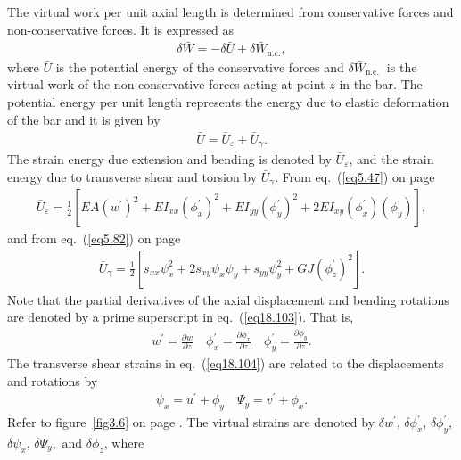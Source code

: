 \documentclass{AeroStructure-ERJohnson}
\begin{document}
The virtual work per unit axial length is determined from conservative forces and non-conservative forces. It is expressed as
\begin{align}\label{eq18.101}
\delta \bar{W}=-\delta \bar{U}+\delta \bar{W}_{\text {n.c.}},
\end{align}
where $\bar{U}$ is the potential energy of the conservative forces and $\delta \bar{W}_{\text {n.c. }}$ is the virtual work of the non-conservative forces acting at point $z$ in the bar. The potential energy per unit length represents the energy due to elastic deformation of the bar and it is given by
\begin{align}\label{eq18.102}
\bar{U}=\bar{U}_{\varepsilon}+\bar{U}_{\gamma}.
\end{align}
The strain energy due extension and bending is denoted by $\bar{U}_{\varepsilon}$, and the strain energy due to transverse shear and torsion by $\bar{U}_{\gamma}$. From eq.~(\ref{eq5.47}) on page \pageref{eq5.47}
\begin{align}\label{eq18.103}
\bar{U}_{\varepsilon}=\frac{1}{2}\left[E A\left(w^{\prime}\right)^{2}+E I_{x x}\left(\phi_{x}^{\prime}\right)^{2}+E I_{y y}\left(\phi_{y}^{\prime}\right)^{2}+2 E I_{x y}\left(\phi_{x}^{\prime}\right)\left(\phi_{y}^{\prime}\right)\right],
\end{align}
and from eq.~(\ref{eq5.82}) on page \pageref{eq5.82}
\begin{align}\label{eq18.104}
\bar{U}_{\gamma}=\frac{1}{2}\left[s_{x x} \psi_{x}^{2}+2 s_{x y} \psi_{x} \psi_{y}+s_{y y} \psi_{y}^{2}+G J\left(\phi_{z}^{\prime}\right)^{2}\right].
\end{align}
Note that the partial derivatives of the axial displacement and bending rotations are denoted by a prime superscript in eq.~(\ref{eq18.103}). That is,
\begin{align}\label{eq18.105}
w^{\prime}=\frac{\partial w}{\partial z} \quad \phi_{x}^{\prime}=\frac{\partial \phi_{x}}{\partial z} \quad \phi_{y}^{\prime}=\frac{\partial \phi_{y}}{\partial z}.
\end{align}
The transverse shear strains in eq.~(\ref{eq18.104}) are related to the displacements and rotations by
\begin{align}\label{eq18.106}
\psi_{x}=u^{\prime}+\phi_{y} \quad \Psi_{y}=v^{\prime}+\phi_{x}.
\end{align}
Refer to figure~\ref{fig3.6} on page \pageref{fig3.6}. The virtual strains are denoted by $\delta w^{\prime}$, $\delta \phi_{x}^{\prime}$, $\delta \phi_{y}^{\prime}$, $\delta \psi_{x}$, $\delta \Psi_{y},\text{ and }\delta \phi_{z}$, where
\end{document}
